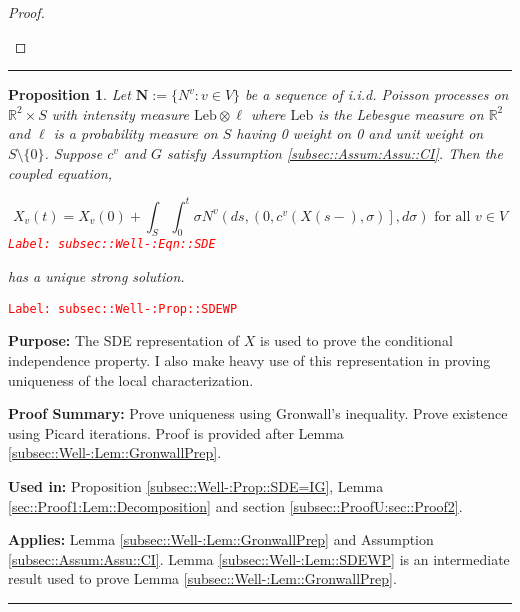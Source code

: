 \documentclass[12pt]{article}
\newcommand{\mb}{\mathbb}
\newcommand{\te}{\text}
\newcommand{\tr}{\textcolor{red}}
\newcommand{\labe}[1]{\tr{\texttt{Label: #1}}}
\newcommand{\purpose}{\textbf{Purpose: }}
\newcommand{\pfsum}{\textbf{Proof Summary: }}
\newcommand{\usein}{\textbf{Used in: }}
\newcommand{\app}{\textbf{Applies: }}
\newcommand{\lin}{\rule{\linewidth}{0.4 pt}}
\newcommand{\defeq}{:=}								%
\renewcommand{\v}{v}							%
\renewcommand{\S}{S}							%
\newcommand{\s}{\sigma}							%
\renewcommand{\t}{t}							%
\renewcommand{\tt}{s}							%
\newcommand{\X}{X}								%
\newcommand{\IGr}{c}							%
\newcommand{\vind}[1]{^{#1}}					%
\newcommand{\cind}[1]{_{#1}}					%
\newcommand{\tp}[1]{(#1)}						%
\newcommand{\poisses}{\mathbf{N}}				%
\newcommand{\poiss}{N}							%
\newcommand{\leb}{\te{Leb}}						%
\newcommand{\Sm}{\ell}							%
\newtheorem{prop}[thms]{Proposition}
\begin{document}
\begin{proof}
\begin{enumerate}[i)]
\end{enumerate}
\end{proof}

\lin

\begin{prop}
Let \(\poisses \defeq \{\poiss\vind{\v}:\v\in V\}\) be a sequence of i.i.d. Poisson processes on \(\mb{R}^2\times \S\) with intensity measure \(\leb\otimes \Sm\) where \(\leb\) is the Lebesgue measure on \(\mb{R}^2\) and \(\Sm\) is a probability measure on \(\S\) having 0 weight on 0 and unit weight on \(\S\setminus \{0\}\). Suppose \(\IGr\vind{\v}\) and \(G\) satisfy Assumption \ref{subsec::Assum:Assu::CI}. Then the coupled equation,

\begin{equation}
\X\cind{\v}\tp{\t} = \X\cind{\v}\tp{0} + \int_\S\int_0^\t \s\poiss\vind{\v}\left(d\tt,\left(0,\IGr\vind{\v}(\X\tp{\tt-},\s)\right],d\s\right) \te{ for all }\v \in V
\label{subsec::Well-:Eqn::SDE}
\end{equation}
\labe{subsec::Well-:Eqn::SDE}

has a unique strong solution.
\label{subsec::Well-:Prop::SDEWP}
\end{prop}
\labe{subsec::Well-:Prop::SDEWP}

\purpose The SDE representation of \(\X\) is used to prove the conditional independence property. I also make heavy use of this representation in proving uniqueness of the local characterization.

\pfsum Prove uniqueness using Gronwall's inequality. Prove existence using Picard iterations. Proof is provided after Lemma \ref{subsec::Well-:Lem::GronwallPrep}.

\usein Proposition \ref{subsec::Well-:Prop::SDE=IG}, Lemma \ref{sec::Proof1:Lem::Decomposition} and section \ref{subsec::ProofU:sec::Proof2}.

\app Lemma \ref{subsec::Well-:Lem::GronwallPrep} and Assumption \ref{subsec::Assum:Assu::CI}. Lemma \ref{subsec::Well-:Lem::SDEWP} is an intermediate result used to prove Lemma \ref{subsec::Well-:Lem::GronwallPrep}.

\lin
\end{document}
